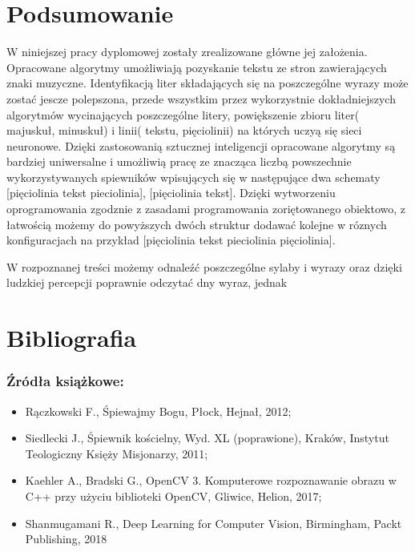\documentclass[a4paper,12pt]{article}
\begin{document}
	   \newpage  
	   \section{Podsumowanie}
	   \par W niniejszej pracy dyplomowej zostały zrealizowane główne jej założenia. Opracowane algorytmy umożliwiają pozyskanie tekstu ze stron zawierających znaki muzyczne. Identyfikacją liter składających się na poszczególne wyrazy może zostać jescze polepszona, przede wszystkim przez wykorzystnie dokładniejszych algorytmów wycinających poszczególne litery, powiększenie zbioru liter( majuskuł, minuskuł) i linii( tekstu, pięciolinii) na których uczyą się sieci neuronowe. Dzięki zastosowanią sztucznej inteligencji opracowane algorytmy są bardziej uniwersalne i umożliwią pracę ze znacząca liczbą powszechnie wykorzystywanych spiewników wpisujących się w następujące dwa schematy [pięciolinia tekst pieciolinia], [pięciolinia tekst]. Dzięki wytworzeniu oprogramowania zgodznie z zasadami programowania zoriętowanego obiektowo, z łatwością możemy do powyższych dwóch struktur dodawać kolejne w róznych konfiguracjach na przykład [pięciolinia tekst pieciolinia pięciolinia]. 
	   
	   
	   
	   \par 
	   
	   
	   
	   W rozpoznanej treści możemy odnaleźć poszczególne sylaby i wyrazy oraz dzięki ludzkiej percepcji poprawnie odczytać dny wyraz, jednak 
	   
	   \newpage
	   \section{Bibliografia}
	   \subsubsection*{Źródła książkowe:}
	   \begin{itemize}
	        \item Rączkowski F., Śpiewajmy Bogu, Płock, Hejnał, 2012;
	        \item Siedlecki J., Śpiewnik kościelny, Wyd. XL (poprawione), Kraków,
	        Instytut Teologiczny Księży Misjonarzy, 2011;
	        \item Kaehler A., Bradski G., OpenCV 3. Komputerowe rozpoznawanie obrazu w C++ przy użyciu biblioteki OpenCV, Gliwice, Helion, 2017;
	        \item Shanmugamani R., Deep Learning for Computer Vision, Birmingham, Packt Publishing, 2018
	   \end{itemize}
	   
\end{document}
